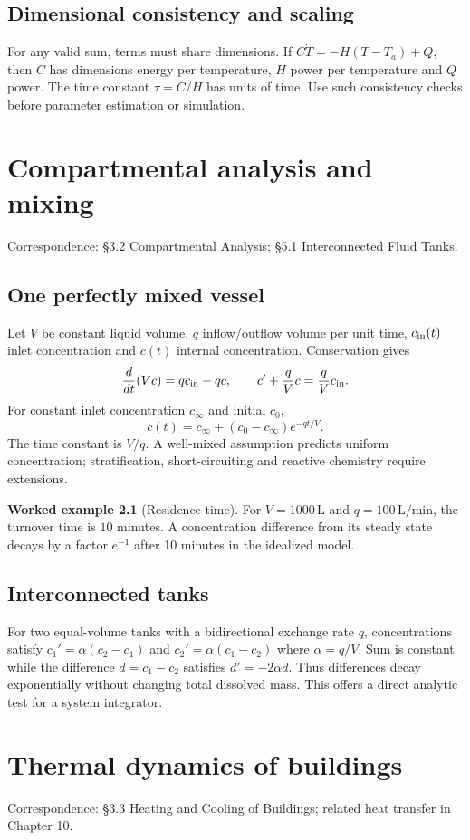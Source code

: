 \documentclass[11pt,letterpaper,oneside]{report}
\theoremstyle{definition}\newtheorem{definition}[theorem]{Definition}
\newtheorem{example}[theorem]{Worked example}
\theoremstyle{remark}\newtheorem{remark}[theorem]{Remark}
\begin{document}
\section{Dimensional consistency and scaling}
For any valid sum, terms must share dimensions. If $C\dot T=-H(T-T_a)+Q$, then $C$ has dimensions energy per temperature, $H$ power per temperature and $Q$ power. The time constant $\tau=C/H$ has units of time. Use such consistency checks before parameter estimation or simulation.
\chapter{Compartmental analysis and mixing}
\begin{bookground}Correspondence: \S3.2 Compartmental Analysis; \S5.1 Interconnected Fluid Tanks.\end{bookground}
\section{One perfectly mixed vessel}
Let $V$ be constant liquid volume, $q$ inflow/outflow volume per unit time, $c_{\rm in}(t)$ inlet concentration and $c(t)$ internal concentration. Conservation gives
\[\frac{d}{dt}(Vc)=q c_{\rm in}-qc,\qquad c'+\frac qV c=\frac qV c_{\rm in}.\]
For constant inlet concentration $c_\infty$ and initial $c_0$,
\[c(t)=c_\infty+(c_0-c_\infty)e^{-qt/V}.\]
The time constant is $V/q$. A well-mixed assumption predicts uniform concentration; stratification, short-circuiting and reactive chemistry require extensions.
\begin{example}[Residence time]
For $V=1000\,\mathrm{L}$ and $q=100\,\mathrm{L/min}$, the turnover time is $10$ minutes. A concentration difference from its steady state decays by a factor $e^{-1}$ after 10 minutes in the idealized model.
\end{example}
\section{Interconnected tanks}
For two equal-volume tanks with a bidirectional exchange rate $q$, concentrations satisfy $c_1'=\alpha(c_2-c_1)$ and $c_2'=\alpha(c_1-c_2)$ where $\alpha=q/V$. Sum is constant while the difference $d=c_1-c_2$ satisfies $d'=-2\alpha d$. Thus differences decay exponentially without changing total dissolved mass. This offers a direct analytic test for a system integrator.
\chapter{Thermal dynamics of buildings}
\begin{bookground}Correspondence: \S3.3 Heating and Cooling of Buildings; related heat transfer in Chapter 10.\end{bookground}
\end{document}

